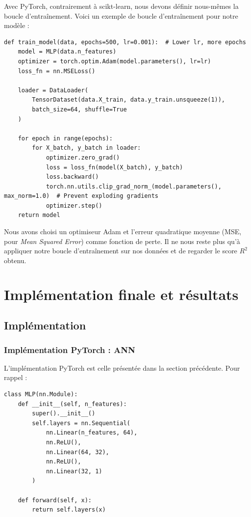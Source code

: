 \documentclass[11pt,a4paper]{article}
\begin{document}
Avec PyTorch, contrairement à scikt-learn, nous devons définir nous-mêmes la boucle d'entraînement. Voici un exemple de boucle d'entraînement pour notre modèle :

\begin{listing}[H]
\label{lst:training_loop}
\caption{Boucle d'entraînement de notre modèle}
\begin{lstlisting}[style=pythonstyle]
def train_model(data, epochs=500, lr=0.001):  # Lower lr, more epochs
    model = MLP(data.n_features)
    optimizer = torch.optim.Adam(model.parameters(), lr=lr)
    loss_fn = nn.MSELoss()

    loader = DataLoader(
        TensorDataset(data.X_train, data.y_train.unsqueeze(1)),
        batch_size=64, shuffle=True
    )

    for epoch in range(epochs):
        for X_batch, y_batch in loader:
            optimizer.zero_grad()
            loss = loss_fn(model(X_batch), y_batch)
            loss.backward()
            torch.nn.utils.clip_grad_norm_(model.parameters(), max_norm=1.0)  # Prevent exploding gradients
            optimizer.step()
    return model
\end{lstlisting}
\end{listing}

Nous avons choisi un optimiseur Adam et l'erreur quadratique moyenne (MSE, pour \textit{Mean Squared Error}) comme fonction de perte. Il ne nous reste plus qu'à appliquer notre boucle d'entraînement sur nos données et de regarder le score $R^2$ obtenu.

\clearpage
\section{Implémentation finale et résultats}

\subsection{Implémentation}

\subsubsection{Implémentation PyTorch : ANN}

L'implémentation PyTorch est celle présentée dans la section précédente. Pour rappel :

\begin{listing}[H]
\caption{Notre ANN (rappel)}
\label{lst:pytorch_model}
\begin{lstlisting}[style=pythonstyle]
class MLP(nn.Module):
    def __init__(self, n_features):
        super().__init__()
        self.layers = nn.Sequential(
            nn.Linear(n_features, 64),
            nn.ReLU(),
            nn.Linear(64, 32),
            nn.ReLU(),
            nn.Linear(32, 1)
        )

    def forward(self, x):
        return self.layers(x)
\end{lstlisting}
\end{listing}
\end{document}
